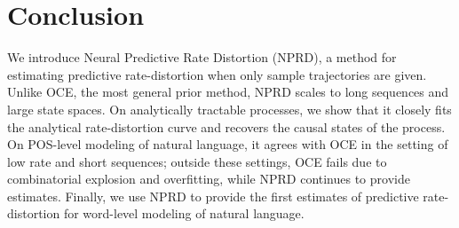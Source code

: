 \documentclass[11pt,letterpaper]{article}
\newcommand{\E}[0]{\mathbb{E}}
\newcounter{theorem}
\newtheorem{proposition}[theorem]{Proposition}
\begin{document}
	





\section{Conclusion}
We introduce Neural Predictive Rate Distortion (NPRD), a method for estimating predictive rate-distortion when only sample trajectories are given.
Unlike OCE, the most general prior method, NPRD scales to long sequences and large state spaces.
On analytically tractable processes, we show that it closely fits the analytical rate-distortion curve and recovers the causal states of the process.
On POS-level modeling of natural language, it agrees with OCE in the setting of low rate and short sequences; outside these settings, OCE fails due to combinatorial explosion and overfitting, while NPRD continues to provide estimates.
Finally, we use NPRD to provide the first estimates of predictive rate-distortion for word-level modeling of natural language.



%

\end{document}
